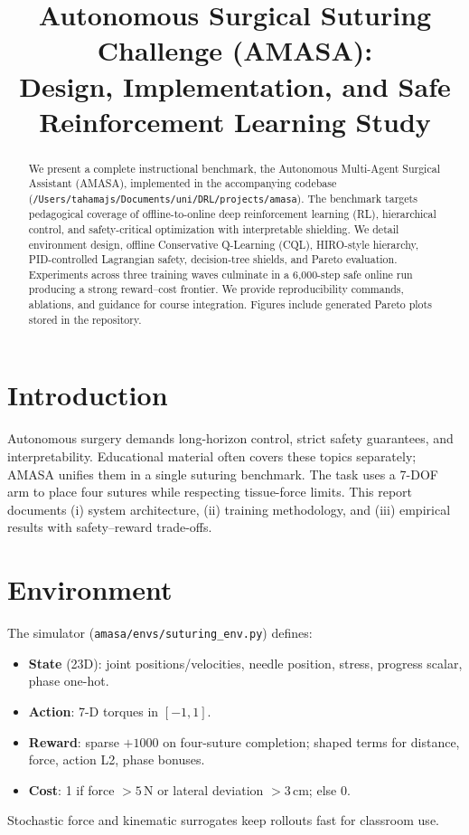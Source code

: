 \documentclass[conference]{IEEEtran}
\title{Autonomous Surgical Suturing Challenge (AMASA):\\
Design, Implementation, and Safe Reinforcement Learning Study}
\author{\IEEEauthorblockN{Codex}
\IEEEauthorblockA{for /Users/tahamajs/Documents/uni/DRL}}
\begin{document}
\maketitle
\begin{abstract}
We present a complete instructional benchmark, the Autonomous Multi-Agent Surgical Assistant (AMASA), implemented in the accompanying codebase (\texttt{/Users/tahamajs/Documents/uni/DRL/projects/amasa}). The benchmark targets pedagogical coverage of offline-to-online deep reinforcement learning (RL), hierarchical control, and safety-critical optimization with interpretable shielding. We detail environment design, offline Conservative Q-Learning (CQL), HIRO-style hierarchy, PID-controlled Lagrangian safety, decision-tree shields, and Pareto evaluation. Experiments across three training waves culminate in a 6{,}000-step safe online run producing a strong reward--cost frontier. We provide reproducibility commands, ablations, and guidance for course integration. Figures include generated Pareto plots stored in the repository.
\end{abstract}

\section{Introduction}
Autonomous surgery demands long-horizon control, strict safety guarantees, and interpretability. Educational material often covers these topics separately; AMASA unifies them in a single suturing benchmark. The task uses a 7-DOF arm to place four sutures while respecting tissue-force limits. This report documents (i) system architecture, (ii) training methodology, and (iii) empirical results with safety--reward trade-offs.

\section{Environment}
The simulator (\texttt{amasa/envs/suturing\_env.py}) defines:
\begin{itemize}[leftmargin=*]
    \item \textbf{State} (23D): joint positions/velocities, needle position, stress, progress scalar, phase one-hot.
    \item \textbf{Action}: 7-D torques in $[-1,1]$.
    \item \textbf{Reward}: sparse $+1000$ on four-suture completion; shaped terms for distance, force, action L2, phase bonuses.
    \item \textbf{Cost}: 1 if force $>5$\,N or lateral deviation $>3$\,cm; else 0.
\end{itemize}
Stochastic force and kinematic surrogates keep rollouts fast for classroom use.
\end{document}

